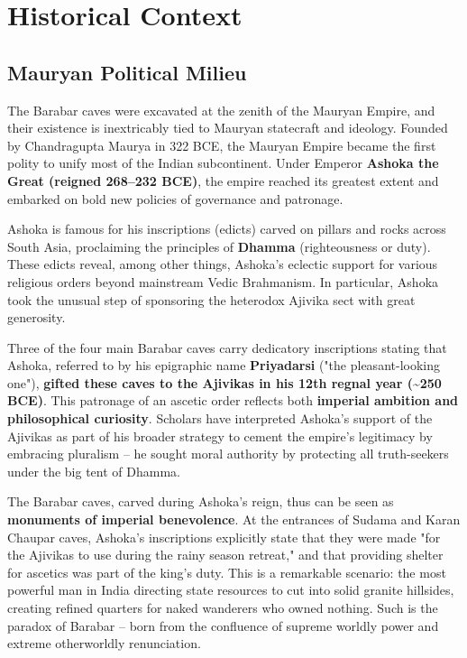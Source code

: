 \documentclass[11pt]{article}
\begin{document}
\section{Historical Context}

\subsection{Mauryan Political Milieu}

The Barabar caves were excavated at the zenith of the Mauryan Empire, and their existence is inextricably tied to Mauryan statecraft and ideology. Founded by Chandragupta Maurya in 322 BCE, the Mauryan Empire became the first polity to unify most of the Indian subcontinent. Under Emperor \textbf{Ashoka the Great (reigned 268--232 BCE)}, the empire reached its greatest extent and embarked on bold new policies of governance and patronage.

Ashoka is famous for his inscriptions (edicts) carved on pillars and rocks across South Asia, proclaiming the principles of \textbf{Dhamma} (righteousness or duty). These edicts reveal, among other things, Ashoka's eclectic support for various religious orders beyond mainstream Vedic Brahmanism. In particular, Ashoka took the unusual step of sponsoring the heterodox Ajivika sect with great generosity.

Three of the four main Barabar caves carry dedicatory inscriptions stating that Ashoka, referred to by his epigraphic name \textbf{Priyadarsi} ("the pleasant-looking one"), \textbf{gifted these caves to the Ajivikas in his 12th regnal year (\textasciitilde 250 BCE)}. This patronage of an ascetic order reflects both \textbf{imperial ambition and philosophical curiosity}. Scholars have interpreted Ashoka's support of the Ajivikas as part of his broader strategy to cement the empire's legitimacy by embracing pluralism -- he sought moral authority by protecting all truth-seekers under the big tent of Dhamma.

The Barabar caves, carved during Ashoka's reign, thus can be seen as \textbf{monuments of imperial benevolence}. At the entrances of Sudama and Karan Chaupar caves, Ashoka's inscriptions explicitly state that they were made "for the Ajivikas to use during the rainy season retreat," and that providing shelter for ascetics was part of the king's duty. This is a remarkable scenario: the most powerful man in India directing state resources to cut into solid granite hillsides, creating refined quarters for naked wanderers who owned nothing. Such is the paradox of Barabar -- born from the confluence of supreme worldly power and extreme otherworldly renunciation.
\end{document}

